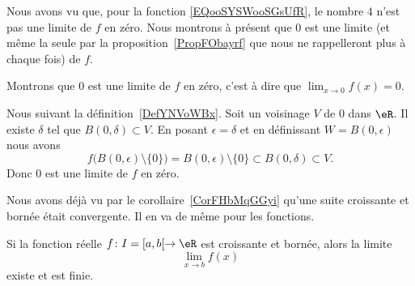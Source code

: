 \begin{example}
    Nous avons vu que, pour la fonction \eqref{EQooSYSWooSGsUfR}, le nombre \( 4\) n'est pas une limite de \( f\) en zéro. Nous montrons à présent que \( 0\) est une limite (et même la seule par la proposition~\ref{PropFObayrf} que nous ne rappelleront plus à chaque fois) de \( f\).

    Montrons que \( 0\) est une limite de \( f\) en zéro, c'est à dire que \( \lim_{x\to 0} f(x)=0\).

    Nous suivant la définition~\ref{DefYNVoWBx}. Soit un voisinage \( V\) de \( 0\) dans \( \eR\). Il existe \( \delta\) tel que \( B(0,\delta)\subset V\). En posant \( \epsilon=\delta\) et en définissant \( W=B(0,\epsilon)\) nous avons
    \begin{equation}
        f\big( B(0,\epsilon)\setminus\{ 0 \} \big)=B(0,\epsilon)\setminus\{ 0 \}\subset  B(0,\delta)\subset V.
    \end{equation}
    Donc \( 0\) est une limite de \( f\) en zéro.
\end{example}

Nous avons déjà vu par le corollaire~\ref{CorFHbMqGGyi} qu'une suite croissante et bornée était convergente. Il en va de même pour les fonctions.
\begin{proposition} \label{PropMTmBYeU}
    Si la fonction réelle \( f\colon I=\mathopen[ a , b [\to \eR\) est croissante et bornée, alors la limite
    \begin{equation}
        \lim_{x\to b} f(x)
    \end{equation}
    existe et est finie.
\end{proposition}

